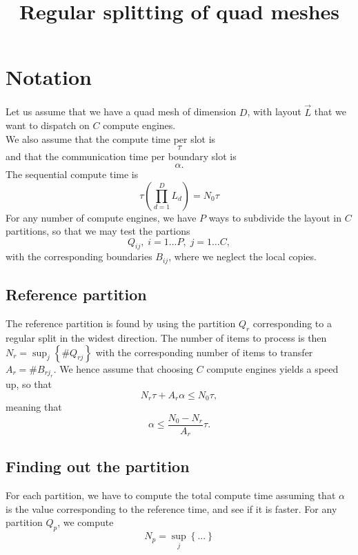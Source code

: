 \documentclass[aps]{revtex4}
\begin{document}
\title{Regular splitting of quad meshes}
\maketitle

\section{Notation}

Let us assume that we have a quad mesh of dimension $D$,
with layout $\vec{L}$ that we want to dispatch
on $C$ compute engines.\\
We also assume that the compute time per slot is 
$$\tau$$ and
that the communication time per boundary slot is 
$$\alpha.$$
The sequential compute time is
$$
	\tau \left(\prod_{d=1}^{D} L_d\right)=N_0 \tau
$$
For any number of compute engines, we have $P$ ways to
subdivide the layout in $C$ partitions, so that we may test
the partions
$$
	Q_{ij},\;{i=1\ldots P,\;j=1\ldots C},
$$
with the corresponding boundaries $B_{ij}$, where we neglect the local copies.

\subsection{Reference partition}
The reference partition is found by using the partition $Q_r$ corresponding
to a regular split in the widest direction. The number of items to process
is then $N_r = \sup_{j}\left\lbrace \#Q_{rj} \right\rbrace$ 
with the corresponding number of items to transfer $A_r = \#B_{rj_r}$.
We hence assume that choosing $C$ compute engines yields a speed up, so that
$$
	N_r\tau+A_r \alpha \leq N_0 \tau,
$$
meaning that
$$
	\alpha \leq \dfrac{N_0-N_r}{A_r} \tau.
$$

\subsection{Finding out the partition}

For each partition, we have to compute the total compute time
assuming that $\alpha$ is the value corresponding to the reference time, and
see if it is faster.
For any partition $Q_p$, we compute
$$
	N_p = \sup_{j}\left\lbrace ... \right\rbrace
$$
\end{document}
